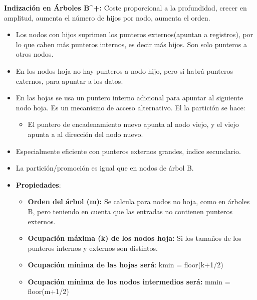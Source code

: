 \documentclass[12pt, twoside, openright]{report} %
\begin{document}
  
  \textbf{Indización en Árboles B\^{}+:} Coste proporcional a la
  profundidad, crecer en amplitud, aumenta el número de hijos por nodo,
  aumenta el orden.
  

  \begin{itemize}
  \item Los nodos con hijos suprimen los punteros externos(apuntan a
    registros), por lo que caben más punteros internos, es decir más
    hijos. Son solo punteros a otros nodos.
    
  \item En los nodos hoja no hay punteros a nodo hijo, pero sí habrá
    punteros externos, para apuntar a los datos.
    
  \item En las hojas se usa un puntero interno adicional para apuntar al
    siguiente nodo hoja. Es un mecanismo de acceso alternativo. El la
    partición se hace:
    

    \begin{itemize}
    \item El puntero de encadenamiento nuevo apunta al nodo viejo, y el
      viejo apunta a al dirección del nodo nuevo.
      
    \end{itemize}
  \item Especialmente eficiente con punteros externos grandes, indice
    secundario.
    
  \item La partición/promoción es igual que en nodos de árbol B.
    
  \item \textbf{Propiedades}:
    

    \begin{itemize}
    \item \textbf{Orden del árbol (m):} Se calcula para nodos no hoja, como
      en árboles B, pero teniendo en cuenta que las entradas no
      contienen punteros externos.
      
    \item \textbf{Ocupación máxima (k) de los nodos hoja:} Si los tamaños de
      los punteros internos y externos son distintos.
      
    \item \textbf{Ocupación mínima de las hojas será}: kmin = floor(k+1/2)
      
    \item \textbf{Ocupación mínima de los nodos intermedios será:} mmin =
      floor(m+1/2)
      

\end{itemize}
\end{itemize}
\end{document}
